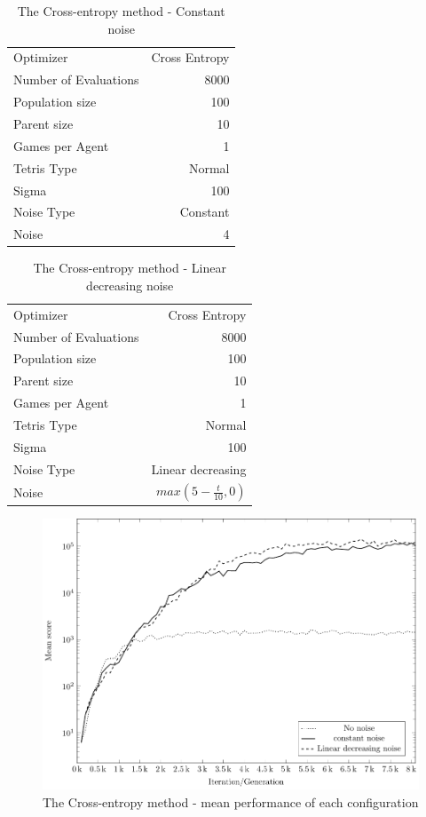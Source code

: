 \begin{table}[h!]
\centering
\begin{tabular}{l r}
Optimizer & Cross Entropy\\
Number of Evaluations & 8000\\
Population size & 100\\
Parent size & 10\\
Games per Agent & 1\\
Tetris Type & Normal\\
\hline
Sigma & 100\\
Noise Type & Constant\\
Noise & 4
\end{tabular}
\caption{The Cross-entropy method - Constant noise}
\end{table}

\begin{table}[h!]
\centering
\begin{tabular}{l r}
Optimizer & Cross Entropy\\
Number of Evaluations & 8000\\
Population size & 100\\
Parent size & 10\\
Games per Agent & 1\\
Tetris Type & Normal\\
\hline
Sigma & 100\\
Noise Type & Linear decreasing\\
Noise & $max \left( 5 - \frac{t}{10}, 0 \right)$
\end{tabular}
\caption{The Cross-entropy method - Linear decreasing noise}
\end{table}

\clearpage

\begin{figure}[H]
\begin{center}
\includegraphics[scale=1]{plots/meansPlot}
\end{center}
\caption{The Cross-entropy method - mean performance of each configuration}
\end{figure}

